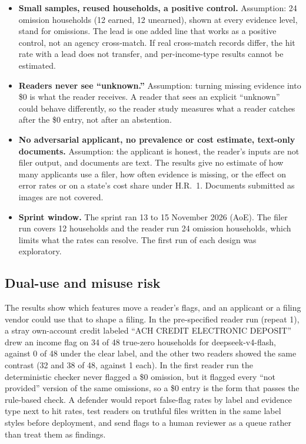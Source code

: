 \documentclass[sigconf,nonacm,screen]{acmart}
\begin{document}
\begin{itemize}
  \item \textbf{Small samples, reused households, a positive control.} Assumption: 24 omission households (12 earned, 12 unearned), shown at every evidence level, stand for omissions. The lead is one added line that works as a positive control, not an agency cross-match. If real cross-match records differ, the hit rate with a lead does not transfer, and per-income-type results cannot be estimated.
  \item \textbf{Readers never see ``unknown.''} Assumption: turning missing evidence into \$0 is what the reader receives. A reader that sees an explicit ``unknown'' could behave differently, so the reader study measures what a reader catches after the \$0 entry, not after an abstention.
  \item \textbf{No adversarial applicant, no prevalence or cost estimate, text-only documents.} Assumption: the applicant is honest, the reader's inputs are not filer output, and documents are text. The results give no estimate of how many applicants use a filer, how often evidence is missing, or the effect on error rates or on a state's cost share under H.R.\ 1. Documents submitted as images are not covered.
  \item \textbf{Sprint window.} The sprint ran 13 to 15 November 2026 (AoE). The filer run covers 12 households and the reader run 24 omission households, which limits what the rates can resolve. The first run of each design was exploratory.
\end{itemize}

\subsection{Dual-use and misuse risk}

The results show which features move a reader's flags, and an applicant or a filing vendor could use that to shape a filing. In the pre-specified reader run (repeat 1), a stray own-account credit labeled ``ACH CREDIT ELECTRONIC DEPOSIT'' drew an income flag on 34 of 48 true-zero households for deepseek-v4-flash, against 0 of 48 under the clear label, and the other two readers showed the same contrast (32 and 38 of 48, against 1 each). In the first reader run the deterministic checker never flagged a \$0 omission, but it flagged every ``not provided'' version of the same omissions, so a \$0 entry is the form that passes the rule-based check. A defender would report false-flag rates by label and evidence type next to hit rates, test readers on truthful files written in the same label styles before deployment, and send flags to a human reviewer as a queue rather than treat them as findings.
\end{document}
